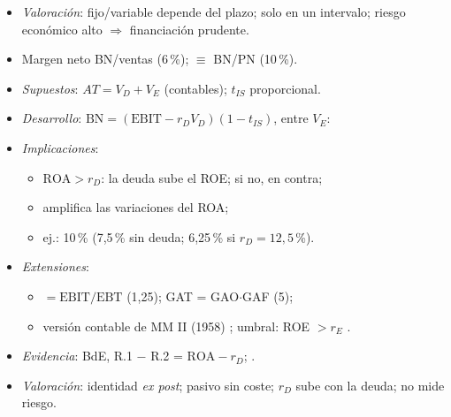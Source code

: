 \documentclass{article}
\begin{document}
\begin{columnas}
\begin{itemize}
\begin{itemize}
  \end{itemize}
\item \emph{Valoración}: fijo/variable depende del plazo; solo en un intervalo; riesgo económico alto $\Rightarrow$ financiación prudente.
\end{itemize}
\begin{itemize}
\item Margen neto BN/ventas (6\,\%);  $\equiv$ BN/PN (10\,\%).
\end{itemize}
\begin{itemize}
\item \emph{Supuestos}: $AT=V_D+V_E$ (contables); $t_{IS}$ proporcional.
\item \emph{Desarrollo}: $\mathrm{BN}=(\mathrm{EBIT}-r_DV_D)(1-t_{IS})$, entre $V_E$:
\item \emph{Implicaciones}:
  \begin{itemize}
  \item $\mathrm{ROA}>r_D$: la deuda sube el ROE; si no, en contra;
  \item amplifica las variaciones del ROA;
  \item ej.: 10\,\% (7,5\,\% sin deuda; 6,25\,\% si $r_D=12{,}5$\,\%).
  \end{itemize}
\end{itemize}
\begin{itemize}
\item \emph{Extensiones}:
  \begin{itemize}
  \item {} $=\mathrm{EBIT}/\mathrm{EBT}$ (1,25); GAT = GAO$\cdot$GAF (5);
  \item versión contable de MM II (1958) ; umbral: ROE $>r_E$ .
  \end{itemize}
\item \emph{Evidencia}: BdE, R.1 $-$ R.2 = $\mathrm{ROA}-r_D$;  .
\item \emph{Valoración}: identidad \emph{ex post}; pasivo sin coste; $r_D$ sube con la deuda; no mide riesgo.
\end{itemize}

\end{columnas}
\end{document}
